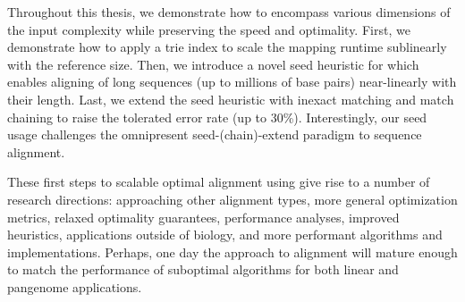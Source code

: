 Throughout this thesis, we demonstrate how to encompass various dimensions of
the input complexity while preserving the speed and optimality. First, we
demonstrate how to apply a trie index to scale the mapping runtime sublinearly
with the reference size. Then, we introduce a novel seed heuristic for \A which
enables aligning of long sequences (up to millions of base pairs) near-linearly
with their length. Last, we extend the seed heuristic with inexact matching and
match chaining to raise the tolerated error rate (up to 30\%). Interestingly,
our seed usage challenges the omnipresent seed-(chain)-extend paradigm to
sequence alignment.

These first steps to scalable optimal alignment using \A give rise to a number
of research directions: approaching other alignment types, more general
optimization metrics, relaxed optimality guarantees, performance analyses,
improved heuristics, applications outside of biology, and more performant
algorithms and implementations. Perhaps, one day the \A approach to alignment
will mature enough to match the performance of suboptimal algorithms for both
linear and pangenome applications.
